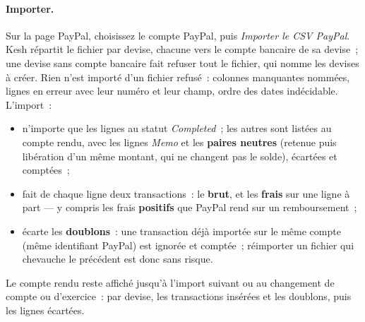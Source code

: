 \documentclass[a4paper,11pt,oneside]{article}
\begin{document}
\paragraph{Importer.} Sur la page PayPal, choisissez le compte PayPal, puis \emph{Importer le CSV PayPal}. Kesh répartit le fichier par devise, chacune vers le compte bancaire de sa devise~; une devise sans compte bancaire fait refuser tout le fichier, qui nomme les devises à créer. Rien n'est importé d'un fichier refusé~: colonnes manquantes nommées, lignes en erreur avec leur numéro et leur champ, ordre des dates indécidable. L'import~:
\begin{itemize}
    \item n'importe que les lignes au statut \emph{Completed}~; les autres sont listées au compte rendu, avec les lignes \emph{Memo} et les \textbf{paires neutres} (retenue puis libération d'un même montant, qui ne changent pas le solde), écartées et comptées~;
    \item fait de chaque ligne deux transactions~: le \textbf{brut}, et les \textbf{frais} sur une ligne à part --- y compris les frais \textbf{positifs} que PayPal rend sur un remboursement~;
    \item écarte les \textbf{doublons}~: une transaction déjà importée sur le même compte (même identifiant PayPal) est ignorée et comptée~; réimporter un fichier qui chevauche le précédent est donc sans risque.
\end{itemize}
Le compte rendu reste affiché jusqu'à l'import suivant ou au changement de compte ou d'exercice~: par devise, les transactions insérées et les doublons, puis les lignes écartées.
\end{document}
